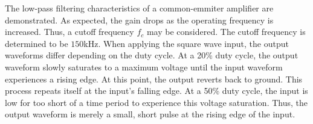 The low-pass filtering characteristics of a common-emmiter amplifier are demonstrated. As expected, the gain drops as the operating frequency is increased. Thus, a cutoff frequency $f_c$ may be considered. The cutoff frequency is determined to be $150$\si{\kilo\hertz}. When applying the square wave input, the output waveforms differ depending on the duty cycle. At a 20\% duty cycle, the output waveform slowly saturates to a maximum voltage until the input waveform experiences a rising edge. At this point, the output reverts back to ground. This process repeats itself at the input's falling edge. At a 50\% duty cycle, the input is low for too short of a time period to experience this voltage saturation. Thus, the output waveform is merely a small, short pulse at the rising edge of the input.
